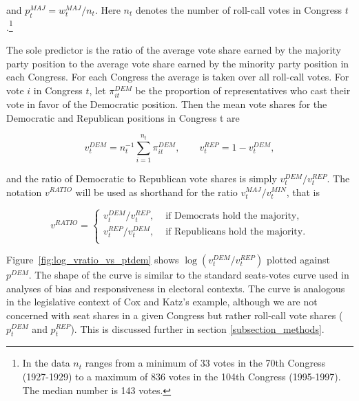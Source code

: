 \noindent and $p_t^{MAJ} = w_t^{MAJ} / n_t$. Here $n_t$ denotes the number of roll-call votes in Congress $t$.\footnote{In the data $n_t$ ranges from a minimum of 33 votes in the 70th Congress (1927-1929) to a maximum of 836 votes in the 104th Congress (1995-1997). The median number is 143 votes.} 

The sole predictor is the ratio of the average vote share earned by the majority party position to the average vote share earned by the minority party position in each Congress.  For each Congress the average is taken over all roll-call votes.  For vote $i$ in Congress $t$, let $\pi_{it}^{DEM}$ be the proportion of representatives who cast their vote in favor of the Democratic position.  Then the mean vote shares for the Democratic and Republican positions in Congress t are

\begin{equation*}
v_t^{DEM} = n_t^{-1} \sum_{i=1}^{n_t} \pi_{it}^{DEM}, \qquad v_t^{REP} = 1 - v_t^{DEM},
\end{equation*}

\noindent and the ratio of Democratic to Republican vote shares is simply $v_t^{DEM} / v_t^{REP}$. The notation $v^{RATIO}$ will be used as shorthand for the ratio $v_t^{MAJ} / v_t^{MIN}$, that is 

\begin{equation*}
v^{RATIO} = 
\begin{cases} 
v_t^{DEM} / v_t^{REP}, & \text{ if Democrats hold the majority,} \\
v_t^{REP} / v_t^{DEM}, & \text{ if Republicans hold the majority.} \\
\end{cases}
\end{equation*}


Figure~\ref{fig:log_vratio_vs_ptdem} shows $\log{(v_t^{DEM} / v_t^{REP} )}$ plotted against $p^{DEM}$. The shape of the curve is similar to the standard seats-votes curve used in analyses of bias and responsiveness in electoral contexts. The curve is analogous in the legislative context of Cox and Katz's example, although we are not concerned with seat shares in a given Congress but rather roll-call vote shares ($p_t^{DEM}$ and $p_t^{REP}$). This is discussed further in section \ref{subsection_methods}. 

